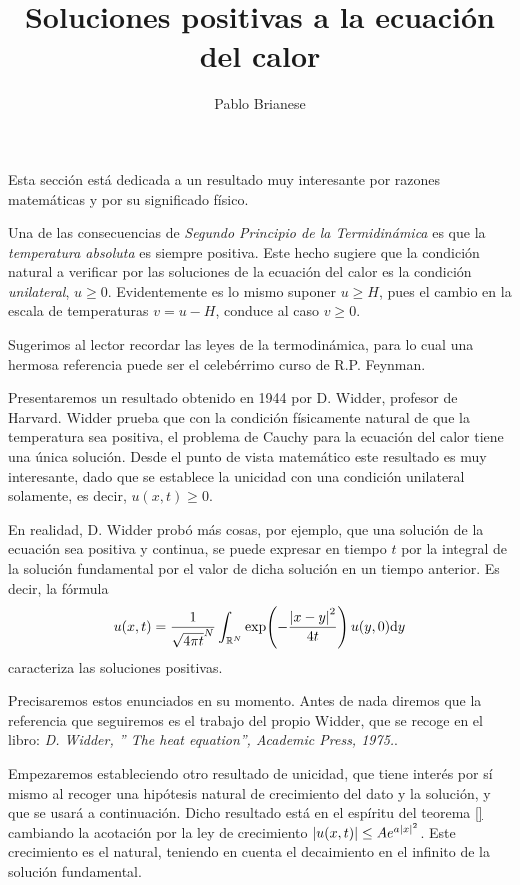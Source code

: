 \documentclass{article}
\title{Soluciones positivas a la ecuación del calor}
\author{Pablo Brianese}
\newcommand{\realNumbers}{\mathbb{R}}
\theoremstyle{remark}
\begin{document}
\maketitle


Esta sección está dedicada a un resultado muy interesante por razones matemáticas y por su significado físico.

Una de las consecuencias de \emph{Segundo Principio de la Termidinámica} es que la \emph{temperatura absoluta} es siempre positiva.
Este hecho sugiere que la condición natural a verificar por las soluciones de la ecuación del calor es la condición \emph{unilateral}, \(u \geq 0\).
Evidentemente es lo mismo suponer \(u \geq H\), pues el cambio en la escala de temperaturas \(v = u - H\), conduce al caso \(v \geq 0\).

Sugerimos al lector recordar las leyes de la termodinámica, para lo cual una hermosa referencia puede ser el celebérrimo curso de R.P. Feynman.

Presentaremos un resultado obtenido en 1944 por D. Widder, profesor de Harvard.
Widder prueba que con la condición físicamente natural de que la temperatura sea positiva, el problema de Cauchy para la ecuación del calor tiene una única solución.
Desde el punto de vista matemático este resultado es muy interesante, dado que se establece la unicidad con una condición unilateral solamente, es decir, \(u(x, t) \geq 0\).

En realidad, D. Widder probó más cosas, por ejemplo, que una solución de la ecuación sea positiva y continua, se puede expresar en tiempo \(t\) por la integral de la solución fundamental por el valor de dicha solución en un tiempo anterior.
Es decir, la fórmula
\begin{align}
  u(x, t)
  =
  \frac{1}{\sqrt{4 \pi t}^N} \int_{\realNumbers^N} \exp\!\left(- \frac{\abs{x - y}^2}{4 t}\right) u(y, 0) \dd y
\end{align}
caracteriza las soluciones positivas.

Precisaremos estos enunciados en su momento.
Antes de nada diremos que la referencia que seguiremos es el trabajo del propio Widder, que se recoge en el libro: \textit{D. Widder, ” The heat equation”, Academic Press, 1975.}.

Empezaremos estableciendo otro resultado de unicidad, que tiene interés por sí mismo al recoger una hipótesis natural de crecimiento del dato y la solución, y que se usará a continuación.
Dicho resultado está en el espíritu del teorema
\ref{} %
cambiando la acotación por la ley de crecimiento \(\abs{u(x, t)} \leq A e^{a \abs{x}^2}\).
Este crecimiento es el natural, teniendo en cuenta el decaimiento en el infinito de la solución fundamental.
\end{document}
